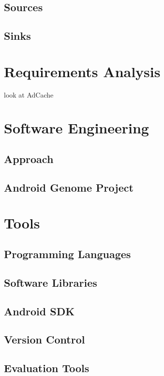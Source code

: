 \documentclass[12pt,twoside,notitlepage]{report}
\begin{document}
\subsection{Sources}

\subsection{Sinks}

\section{Requirements Analysis}
look at AdCache

\section{Software Engineering}

\subsection{Approach}

\subsection{Android Genome Project}

\section{Tools}

\subsection{Programming Languages}

\subsection{Software Libraries}

\subsection{Android SDK}

\subsection{Version Control}

\subsection{Evaluation Tools}
\end{document}
